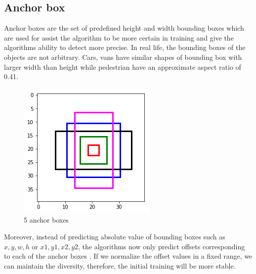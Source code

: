 \subsection{Anchor box}
\hspace{0.5cm}Anchor boxes are the set of predefined height and width bounding boxes which are used for assist the algorithm to be more certain in training and give the algorithms ability to detect more precise.
In real life, the bounding boxes of the objects are not arbitrary. Cars, vans have similar shapes of bounding box with larger width than height while pedestrian have an approximate aspect ratio of 0.41.
\begin{figure}[h!]
    \centering
    \includegraphics[scale=0.5]{Chapters/Fig/anchor_boxes.png}
    \caption{5 anchor boxes}
    \label{fig:ab}
\end{figure}\par
Moreover, instead of predicting absolute value of bounding boxes such as $x,y,w,h$ or $x1,y1,x2,y2$, the algorithms now only predict offsets corresponding to each of the anchor boxes . If we normalize the offset values in a fixed range, we can maintain the diversity, therefore, the initial training will be more stable.
